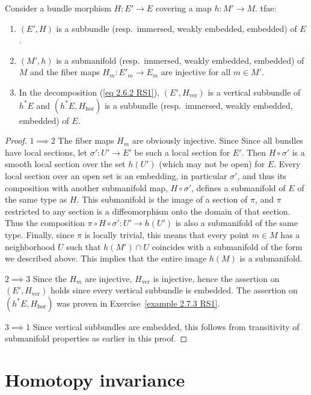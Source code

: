 \begin{prop}[{{\cite[Prop.~2.7.4]{RS1}}}]
    Consider a bundle morphism $H:E'\to E$ covering a map $h:M'\to M$.  \gls{tfae}:
    \begin{enumerate}
        \item $(E',H)$ is a subbundle (resp.~immersed, weakly embedded, embedded) of $E$.
        \item $(M',h)$ is a submanifold (resp.~immersed, weakly embedded, embedded) of $M$ and the fiber maps $H_m:E'_m\to E_m$ are injective for all $m\in M'$.
        \item In the decomposition (\ref{eq 2.6.2 RS1}), $(E',H_{\mathrm{ver}})$ is a vertical subbundle of $h^\ast E$ and $(h^\ast E,H_{\mathrm{hor}})$ is a subbundle (resp.~immersed, weakly embedded, embedded) of $E$.
    \end{enumerate}
\end{prop}
\begin{proof}
    $1\implies 2$ The fiber maps $H_m$ are obviously injective. Since Since all bundles have local sections, let $\sigma':U'\to E'$ be such a local section for $E'$. Then $H\circ\sigma'$ is a smooth local section over the set $h(U')$ (which may not be open) for $E$. Every local section over an open set is an embedding, in particular $\sigma'$, and thus its composition with another submanifold map, $H\circ \sigma'$, defines a submanifold of $E$ of the same type as $H$. This submanifold is the image of a section of $\pi$, and $\pi$ restricted to any section is a diffeomorphism onto the domain of that section. Thus the composition $\pi\circ H\circ \sigma':U'\to h(U')$ is also a submanifold of the same type. Finally, since $\pi$ is locally trivial, this means that every point $m\in M$ has a neighborhood $U$ such that $h(M')\cap U$ coincides with a submanifold of the form we described above. This implies that the entire image $h(M)$ is a submanifold.
    
    $2\implies 3$ Since the $H_m$ are injective, $H_{\mathrm{ver}}$ is injective, hence the assertion on $(E',H_{\mathrm{ver}})$ holds since every vertical subbundle is embedded. The assertion on $(h^\ast E,H_{\mathrm{hor}})$ was proven in Exercise~\ref{example 2.7.3 RS1}.

    $3\implies 1$ Since vertical subbundles are embedded, this follows from transitivity of submanifold properties as earlier in this proof.
\end{proof}




\section{Homotopy invariance}


